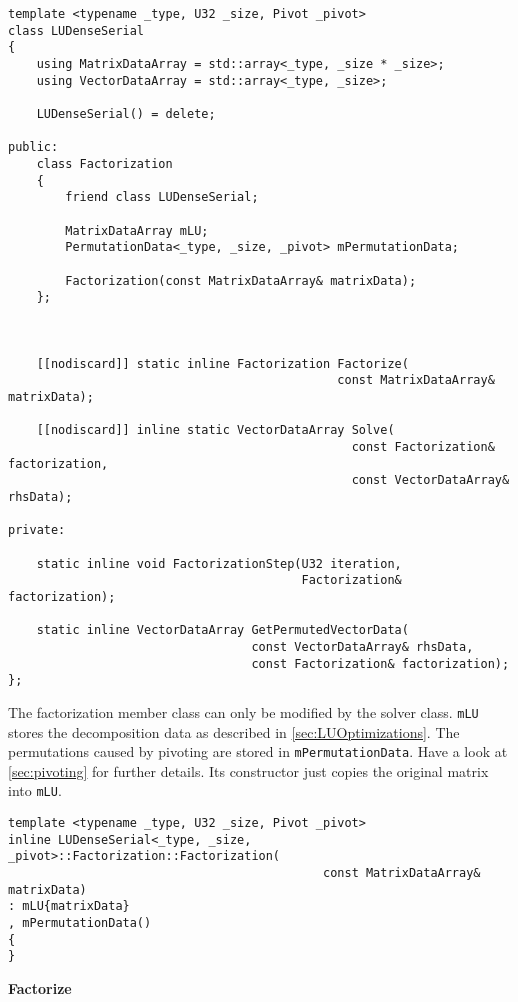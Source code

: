 \begin{verbatim}
template <typename _type, U32 _size, Pivot _pivot>
class LUDenseSerial
{
    using MatrixDataArray = std::array<_type, _size * _size>;
    using VectorDataArray = std::array<_type, _size>;
	
    LUDenseSerial() = delete;
	
public:
    class Factorization
    {
        friend class LUDenseSerial;
		
        MatrixDataArray mLU;
        PermutationData<_type, _size, _pivot> mPermutationData;
		
        Factorization(const MatrixDataArray& matrixData);
    };
	
	
	
    [[nodiscard]] static inline Factorization Factorize(
                                              const MatrixDataArray& matrixData);
	
    [[nodiscard]] inline static VectorDataArray Solve(
                                                const Factorization& factorization,
                                                const VectorDataArray& rhsData);
	
private:
	
    static inline void FactorizationStep(U32 iteration, 
                                         Factorization& factorization);
		
    static inline VectorDataArray GetPermutedVectorData(
                                  const VectorDataArray& rhsData,
                                  const Factorization& factorization);
};
\end{verbatim}

\newpage 
The factorization member class can only be modified by the solver class.
\texttt{mLU} stores the decomposition data as described in \cref{sec:LUOptimizations}.
The permutations caused by pivoting are stored in \texttt{mPermutationData}.
Have a look at \cref{sec:pivoting} for further details.
Its constructor just copies the original matrix into \texttt{mLU}.

\begin{verbatim}
template <typename _type, U32 _size, Pivot _pivot>
inline LUDenseSerial<_type, _size, _pivot>::Factorization::Factorization(
                                            const MatrixDataArray& matrixData)
: mLU{matrixData}
, mPermutationData()
{
}
\end{verbatim}

\vspace{1cm}
\textbf{Factorize}
\vspace{0.5cm}

